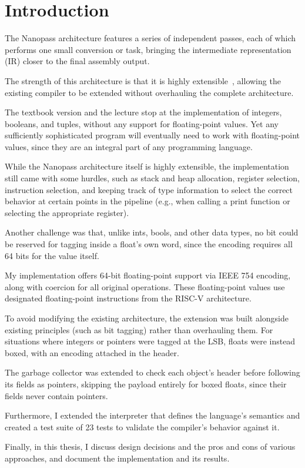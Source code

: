 \chapter{Introduction}\label{chap:introduction}
The Nanopass architecture features a series of independent passes, each of which performs one small conversion or task, bringing the intermediate representation (IR) closer to the final assembly output.

The strength of this architecture is that it is highly extensible~\citep{siek2023essentials}, allowing the existing compiler to be extended without overhauling the complete architecture.

The textbook version and the lecture stop at the implementation of integers, booleans, and tuples, without any support for floating-point values. Yet any sufficiently sophisticated program will eventually need to work with floating-point values, since they are an integral part of any programming language.

While the Nanopass architecture itself is highly extensible, the implementation still came with some hurdles, such as stack and heap allocation, register selection, instruction selection, and keeping track of type information to select the correct behavior at certain points in the pipeline (e.g., when calling a print function or selecting the appropriate register).

Another challenge was that, unlike ints, bools, and other data types, no bit could be reserved for tagging inside a float's own word, since the encoding requires all 64 bits for the value itself.

My implementation offers 64-bit floating-point support via IEEE 754 encoding, along with coercion for all original operations. These floating-point values use designated floating-point instructions from the RISC-V architecture.

To avoid modifying the existing architecture, the extension was built alongside existing principles (such as bit tagging) rather than overhauling them. For situations where integers or pointers were tagged at the LSB, floats were instead boxed, with an encoding attached in the header.

The garbage collector was extended to check each object's header before following its fields as pointers, skipping the payload entirely for boxed floats, since their fields never contain pointers.

Furthermore, I extended the interpreter that defines the language's semantics and created a test suite of 23 tests to validate the compiler's behavior against it.

Finally, in this thesis, I discuss design decisions and the pros and cons of various approaches, and document the implementation and its results.